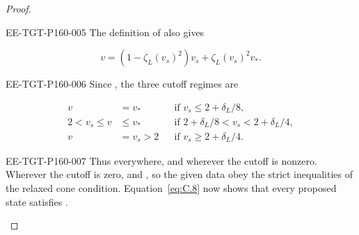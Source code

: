 \begin{proof}
\begin{EESegment}{EE-TGT-P160-005}
The definition of  also gives
\end{EESegment}
\[
 v=(1-\zeta_L(v_s)^2)v_s+\zeta_L(v_s)^2v_*.
\]
\begin{EESegment}{EE-TGT-P160-006}
Since , the three cutoff regimes are
\end{EESegment}
\[
\begin{aligned}
 v&=v_* &&\text{if }v_s\leq2+\delta_L/8,\\
 2<v_s\leq v&\leq v_* &&\text{if }2+\delta_L/8<v_s<2+\delta_L/4,\\
 v&=v_s>2 &&\text{if }v_s\geq2+\delta_L/4.
\end{aligned}
\]
\begin{EESegment}{EE-TGT-P160-007}
Thus  everywhere, and  wherever the cutoff is nonzero. Wherever the cutoff
is zero,  and , so the given data  obey the strict inequalities of the relaxed cone condition. Equation~\eqref{eq:C.8} now shows that every proposed state satisfies
.
\end{EESegment}


\end{proof}
